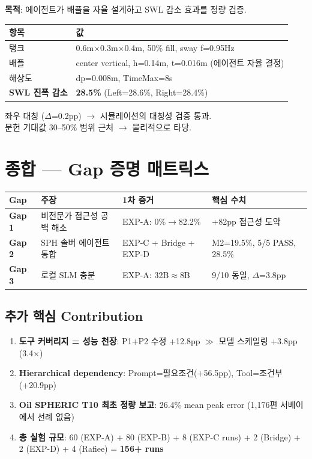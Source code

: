 \documentclass[10pt,a4paper]{article}
\begin{document}
\textbf{목적}: 에이전트가 배플을 자율 설계하고 SWL 감소 효과를 정량 검증.

\begin{center}
\renewcommand{\arraystretch}{1.1}
\begin{tabular}{ll}
\toprule
항목 & 값 \\
\midrule
탱크 & 0.6m$\times$0.3m$\times$0.4m, 50\% fill, sway f=0.95Hz \\
배플 & center vertical, h=0.14m, t=0.016m (에이전트 자율 결정) \\
해상도 & dp=0.008m, TimeMax=8s \\
\midrule
\textbf{SWL 진폭 감소} & \textbf{28.5\%} (Left=28.6\%, Right=28.4\%) \\
\bottomrule
\end{tabular}
\end{center}

좌우 대칭 ($\Delta$=0.2pp) $\rightarrow$ 시뮬레이션의 대칭성 검증 통과.\\
문헌 기대값 30--50\% 범위 근처 $\rightarrow$ 물리적으로 타당.

\section{종합 — Gap 증명 매트릭스}

\begin{center}
\renewcommand{\arraystretch}{1.3}
\begin{tabular}{>{\bfseries}p{2cm}p{3.2cm}p{3.5cm}p{4cm}}
\toprule
Gap & 주장 & 1차 증거 & 핵심 수치 \\
\midrule
\cellcolor{lightgray}Gap 1 & 비전문가 접근성 공백 해소 & EXP-A: 0\%$\rightarrow$82.2\% & +82pp 접근성 도약 \\
\cellcolor{lightgray}Gap 2 & SPH 솔버 에이전트 통합 & EXP-C + Bridge + EXP-D & M2=19.5\%, 5/5 PASS, 28.5\% \\
\cellcolor{lightgray}Gap 3 & 로컬 SLM 충분 & EXP-A: 32B$\approx$8B & 9/10 동일, $\Delta$=3.8pp \\
\bottomrule
\end{tabular}
\end{center}

\subsection{추가 핵심 Contribution}

\begin{enumerate}[nosep,leftmargin=1.5em]
\item \textbf{도구 커버리지 = 성능 천장}: P1+P2 수정 +12.8pp $\gg$ 모델 스케일링 +3.8pp (3.4$\times$)
\item \textbf{Hierarchical dependency}: Prompt=필요조건(+56.5pp), Tool=조건부(+20.9pp)
\item \textbf{Oil SPHERIC T10 최초 정량 보고}: 26.4\% mean peak error (1,176편 서베이에서 선례 없음)
\item \textbf{총 실험 규모}: 60 (EXP-A) + 80 (EXP-B) + 8 (EXP-C runs) + 2 (Bridge) + 2 (EXP-D) + 4 (Rafiee) = \textbf{156+ runs}
\end{enumerate}
\end{document}
